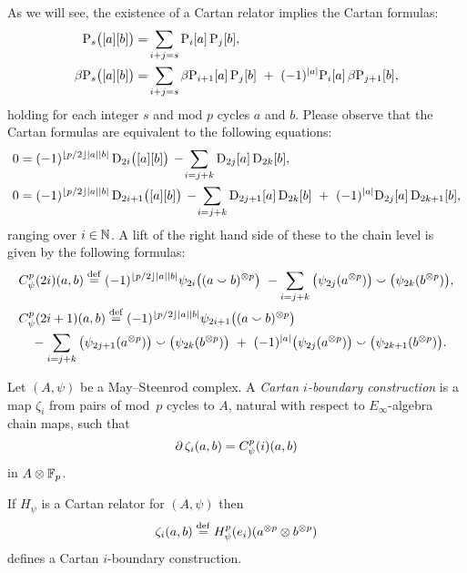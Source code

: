 As we will see, the existence of a Cartan relator implies the Cartan formulas:
\begin{align*}
	\mathrm{P}_s\big([a][b]\big) =&
	\sum_{i+j=s} \mathrm{P}_i[a] \, \mathrm{P}_j[b], \\
	\beta\mathrm{P}_s\big([a][b]\big) =&
	\sum_{i+j=s} \beta\mathrm{P}_{i+1}[a] \, \mathrm{P}_j[b] \ +\ (-1)^{\lvert a\rvert} \mathrm{P}_i[a] \, \beta\mathrm{P}_{j+1}[b],
\end{align*}
holding for each integer $s$ and mod $p$ cycles $a$ and $b$.
Please observe that the Cartan formulas are equivalent to the following equations:
\begin{align*}
	0 &= (-1)^{\floor{p/2}\bars{a}\bars{b}} \, \rD_{2i}\big([a][b]\big) \,-\!
	\sum_{i=j+k} \rD_{2j}[a] \, \rD_{2k}[b], \\
	0 &= (-1)^{\floor{p/2}\bars{a}\bars{b}} \, \rD_{2i+1}\big([a][b]\big) \,-\!
	\sum_{i=j+k} \rD_{2j+1}[a] \, \rD_{2k}[b] \ +\ (-1)^{\bars{a}}\rD_{2j}[a] \, \rD_{2k+1}[b],
\end{align*}
ranging over $i \in \mathbb{N}$.
A lift of the right hand side of these to the chain level is given by the following formulas:
\begin{align*}
	&C_\psi^p(2i)(a,b) \stackrel{\mathrm{def}}{=} (-1)^{\lfloor p/2\rfloor\lvert a\rvert\lvert b\rvert} \psi_{2i}\big((a \smallsmile b)^{\otimes p}\big) \ -
	\sum_{i=j+k}\big(\psi_{2j}(a^{\otimes p})\big) \smallsmile \big(\psi_{2k}(b^{\otimes p})\big), \\
	&C_\psi^p(2i+1)(a,b) \stackrel{\mathrm{def}}{=} (-1)^{\lfloor p/2\rfloor\lvert a\rvert\lvert b\rvert} \psi_{2i+1}\big((a \smallsmile b)^{\otimes p}\big) \\
	&\quad -\sum_{i=j+k} \big(\psi_{2j+1}(a^{\otimes p})\big) \smallsmile \big(\psi_{2k}(b^{\otimes p})\big)\ +\
	(-1)^{\lvert a\rvert}\big(\psi_{2j}(a^{\otimes p})\big) \smallsmile \big(\psi_{2k+1}(b^{\otimes p})\big).
\end{align*}

\begin{definition*}
	Let $(A,\psi)$ be a May--Steenrod complex.
	A \textit{Cartan $i$-boundary construction} is a map $\zeta_i$ from pairs of mod~$p$ cycles to $A$, natural with respect to $E_\infty$-algebra chain maps, such that
	\[
	\operatorname{\partial} \zeta_i(a,b) = C_\psi^p(i)(a, b)
	\]
	in $A \otimes {\mathbb{F}_p}$.
\end{definition*}

\begin{theorem*}
	If $H_\psi$ is a Cartan relator for $(A, \psi)$ then
	\[
	\zeta_i(a,b) \stackrel{\mathrm{def}}{=} H_\psi^p(e_i)(a^{\otimes p} \otimes b^{\otimes p})
	\]
	defines a Cartan $i$-boundary construction.
\end{theorem*}

